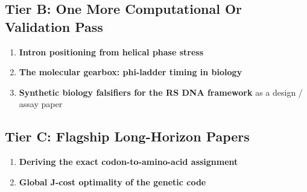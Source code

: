 \documentclass[11pt]{article}
\begin{document}
\subsection*{Tier B: One More Computational Or Validation Pass}
\begin{enumerate}[start=5]
\item \textbf{Intron positioning from helical phase stress}
\item \textbf{The molecular gearbox: phi-ladder timing in biology}
\item \textbf{Synthetic biology falsifiers for the RS DNA framework} as a design / assay paper
\end{enumerate}

\subsection*{Tier C: Flagship Long-Horizon Papers}
\begin{enumerate}[start=8]
\item \textbf{Deriving the exact codon-to-amino-acid assignment}
\item \textbf{Global J-cost optimality of the genetic code}
\end{enumerate}
\end{document}
